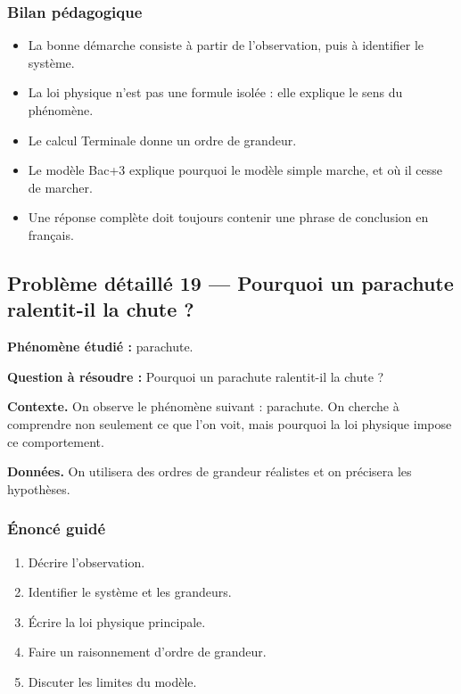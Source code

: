 \documentclass[11pt,a4paper]{article}
\begin{document}
\subsubsection*{Bilan pédagogique}

\begin{methodebox}
\begin{itemize}
  \item La bonne démarche consiste à partir de l'observation, puis à identifier le système.
  \item La loi physique n'est pas une formule isolée : elle explique le sens du phénomène.
  \item Le calcul Terminale donne un ordre de grandeur.
  \item Le modèle Bac+3 explique pourquoi le modèle simple marche, et où il cesse de marcher.
  \item Une réponse complète doit toujours contenir une phrase de conclusion en français.
\end{itemize}
\end{methodebox}

\subsection{Problème détaillé 19 — Pourquoi un parachute ralentit-il la chute ?}

\begin{exercicebox}
\textbf{Phénomène étudié :} parachute.

\medskip
\textbf{Question à résoudre :} Pourquoi un parachute ralentit-il la chute ?

\medskip
\textbf{Contexte.} On observe le phénomène suivant : parachute. On cherche à comprendre non seulement ce que l'on voit, mais pourquoi la loi physique impose ce comportement.

\medskip
\textbf{Données.} On utilisera des ordres de grandeur réalistes et on précisera les hypothèses.
\end{exercicebox}

\subsubsection*{Énoncé guidé}

\begin{enumerate}
  \item Décrire l'observation.
  \item Identifier le système et les grandeurs.
  \item Écrire la loi physique principale.
  \item Faire un raisonnement d'ordre de grandeur.
  \item Discuter les limites du modèle.
\end{enumerate}
\end{document}

